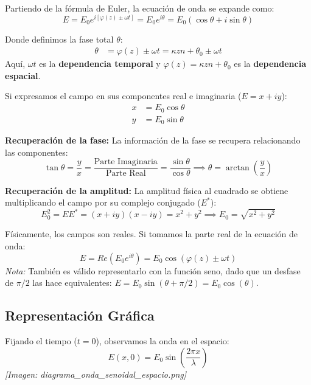 \documentclass[12pt]{article}
\begin{document}
	Partiendo de la fórmula de Euler, la ecuación de onda se expande como:
	\begin{equation*}
		E = E_0 e^{i[\varphi(z) \pm \omega t]} = E_0 e^{i\theta} = E_0 (\cos\theta + i\sin\theta)
	\end{equation*}
	
	Donde definimos la fase total $\theta$:
	\begin{align*}
		\theta &= \varphi(z) \pm \omega t = \kappa z n + \theta_0 \pm \omega t
	\end{align*}
	Aquí, $\omega t$ es la \textbf{dependencia temporal} y $\varphi(z) = \kappa z n + \theta_0$ es la \textbf{dependencia espacial}.
	
	Si expresamos el campo en sus componentes real e imaginaria ($E = x + iy$):
	\begin{align*}
		x &= E_0 \cos\theta \\
		y &= E_0 \sin\theta
	\end{align*}
	
	\textbf{Recuperación de la fase:}
	La información de la fase se recupera relacionando las componentes:
	\begin{equation*}
		\tan\theta = \frac{y}{x} = \frac{\text{Parte Imaginaria}}{\text{Parte Real}} = \frac{\sin\theta}{\cos\theta} \implies \theta = \arctan\left(\frac{y}{x}\right)
	\end{equation*}
	
	\textbf{Recuperación de la amplitud:}
	La amplitud física al cuadrado se obtiene multiplicando el campo por su complejo conjugado ($E^*$):
	\begin{equation*}
		E_0^2 = E E^* = (x+iy)(x-iy) = x^2 + y^2 \implies E_0 = \sqrt{x^2 + y^2}
	\end{equation*}
	
	Físicamente, los campos son reales. Si tomamos la parte real de la ecuación de onda:
	\begin{equation*}
		E = Re(E_0 e^{i\theta}) = E_0 \cos(\varphi(z) \pm \omega t)
	\end{equation*}
	\textit{Nota:} También es válido representarlo con la función seno, dado que un desfase de $\pi/2$ las hace equivalentes: $E = E_0 \sin(\theta + \pi/2) = E_0 \cos(\theta)$.
	
	\subsection{Representación Gráfica}
	Fijando el tiempo ($t=0$), observamos la onda en el espacio:
	\begin{equation*}
		E(x,0) = E_0 \sin\left(\frac{2\pi x}{\lambda}\right)
	\end{equation*}
	\textit{[Imagen: diagrama\_onda\_senoidal\_espacio.png]}
	
\end{document}
